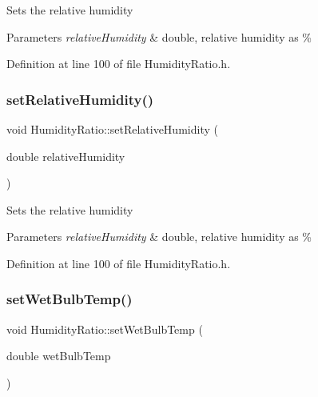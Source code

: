 Sets the relative humidity


\begin{DoxyParams}{Parameters}
{\em relative\+Humidity} & double, relative humidity as \% \\
\hline
\end{DoxyParams}


Definition at line 100 of file Humidity\+Ratio.\+h.

\mbox{\label{class_humidity_ratio_a110aecb6587a836ab76d4aca840e5759}} 
\subsubsection{\texorpdfstring{set\+Relative\+Humidity()}{setRelativeHumidity()}\hspace{0.1cm}{\footnotesize\ttfamily [3/3]}}
{\footnotesize\ttfamily void Humidity\+Ratio\+::set\+Relative\+Humidity (\begin{DoxyParamCaption}\item[{double}]{relative\+Humidity }\end{DoxyParamCaption})\hspace{0.3cm}{\ttfamily [inline]}}

Sets the relative humidity


\begin{DoxyParams}{Parameters}
{\em relative\+Humidity} & double, relative humidity as \% \\
\hline
\end{DoxyParams}


Definition at line 100 of file Humidity\+Ratio.\+h.

\mbox{\label{class_humidity_ratio_a5bda925f783cb4cef848245b00e28e29}} 
\subsubsection{\texorpdfstring{set\+Wet\+Bulb\+Temp()}{setWetBulbTemp()}\hspace{0.1cm}{\footnotesize\ttfamily [1/3]}}
{\footnotesize\ttfamily void Humidity\+Ratio\+::set\+Wet\+Bulb\+Temp (\begin{DoxyParamCaption}\item[{double}]{wet\+Bulb\+Temp }\end{DoxyParamCaption})\hspace{0.3cm}{\ttfamily [inline]}}


